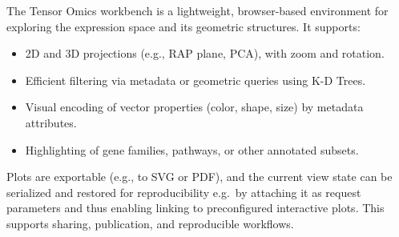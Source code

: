         The Tensor Omics workbench is a lightweight, browser-based environment for exploring the expression space and its geometric structures. It supports:

        \begin{itemize}
            \item 2D and 3D projections (e.g., RAP plane, PCA), with zoom and rotation.
            \item Efficient filtering via metadata or geometric queries using K-D Trees.
            \item Visual encoding of vector properties (color, shape, size) by metadata attributes.
            \item Highlighting of gene families, pathways, or other annotated subsets.
        \end{itemize}

        Plots are exportable (e.g., to SVG or PDF), and the current view state can be
        serialized and restored for reproducibility e.g.\ by attaching it as request
        parameters and thus enabling linking to preconfigured interactive plots. This
        supports sharing, publication, and reproducible workflows.